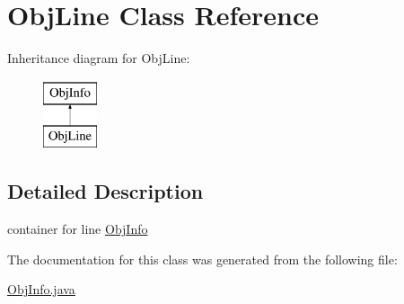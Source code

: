 \hypertarget{classObjLine}{
\section{ObjLine Class Reference}
\label{classObjLine}
}
Inheritance diagram for ObjLine:\begin{figure}[H]
\begin{center}
\leavevmode
\includegraphics[height=2.000000cm]{classObjLine}
\end{center}
\end{figure}


\subsection{Detailed Description}
container for line \hyperlink{classObjInfo}{ObjInfo} 

The documentation for this class was generated from the following file:\begin{DoxyCompactItemize}
\item 
\hyperlink{ObjInfo_8java}{ObjInfo.java}\end{DoxyCompactItemize}
